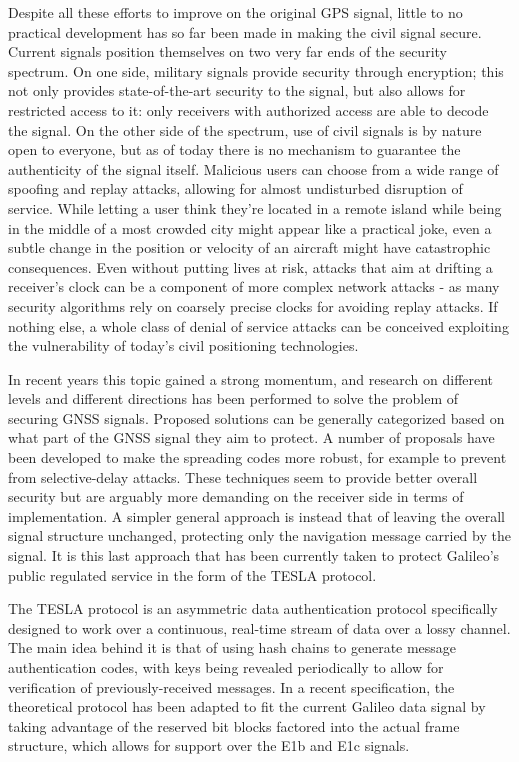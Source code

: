 \vspace{\baselineskip}

Despite all these efforts to improve on the original GPS signal, little to no
practical development has so far been made in making the civil signal secure.
Current signals position themselves on two very far ends of the security
spectrum. On one side, military signals provide security through encryption;
this not only provides state-of-the-art security to the signal, but also allows
for restricted access to it: only receivers with authorized access are able to
decode the signal. On the other side of the spectrum, use of civil signals is by
nature open to everyone, but as of today there is no mechanism to guarantee the
authenticity of the signal itself. Malicious users can choose from a wide range
of spoofing and replay attacks, allowing for almost undisturbed disruption of
service. While letting a user think they're located in a remote island while
being in the middle of a most crowded city might appear like a practical joke,
even a subtle change in the position or velocity of an aircraft might have
catastrophic consequences. Even without putting lives at risk, attacks that aim
at drifting a receiver's clock can be a component of more complex network
attacks - as many security algorithms rely on coarsely precise clocks for
avoiding replay attacks. If nothing else, a whole class of denial of service
attacks can be conceived exploiting the vulnerability of today's civil
positioning technologies.

In recent years this topic gained a strong momentum, and research on different
levels and different directions has been performed to solve the problem of
securing GNSS signals. Proposed solutions can be generally categorized based
on what part of the GNSS signal they aim to protect. A number of proposals have
been developed to make the spreading codes more robust, for example to prevent
from selective-delay attacks. These techniques seem to provide better overall
security but are arguably more demanding on the receiver side in terms of
implementation. A simpler general approach is instead that of leaving the
overall signal structure unchanged, protecting only the navigation message
carried by the signal. It is this last approach that has been currently taken to
protect Galileo's public regulated service in the form of the TESLA protocol.

The TESLA protocol is an asymmetric data authentication protocol specifically
designed to work over a continuous, real-time stream of data over a lossy
channel. The main idea behind it is that of using hash chains to generate
message authentication codes, with keys being revealed periodically to allow for
verification of previously-received messages. In a recent specification, the
theoretical protocol has been adapted to fit the current Galileo data signal by
taking advantage of the reserved bit blocks factored into the actual frame
structure, which allows for support over the E1b and E1c signals. 


